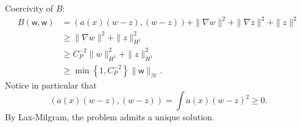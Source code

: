 \documentclass[letterpaper,twoside,11pt]{article}
\theoremstyle{mystyle}
\begin{document}
\begin{enumerate}
  Coercivity of $B$: 
  \begin{align*}
    B\left( \mathsf w, \mathsf w \right) &= \left( a(x) (w-z), (w-z) \right) + \|\nabla w\|^2 + \|\nabla z\|^2 + \|z\|^2 \\[.2cm]
    &\geq \|\nabla w \|^2 + \|z\|^2_{H^1} \\[.2cm]
    &\geq C_P^{-2} \|w\|^2_{H^1} + \|z\|^2_{H^1}\\[.2cm]
    &\geq \min\left\{ 1, C_P^{-2} \right\} \|\mathsf w\|_{\mathcal H}.
  \end{align*}
  Notice in particular that 
  \[\left( a(x) (w-z), (w-z) \right) = \int a(x) (w-z)^2 \geq 0.\]
  By Lax-Milgram, the problem admits a unique solution. 


\end{enumerate}
\end{document}

